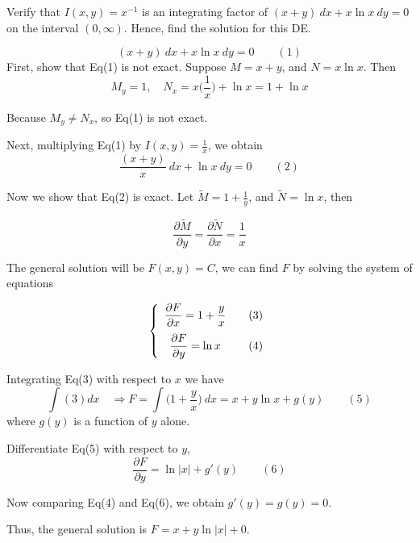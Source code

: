 \begin{example}
    Verify that $I(x,y) = x^{-1}$ is an integrating factor of 
    $(x+y)\> dx + x\ln x \> dy = 0$ on the interval $(0, \infty)$. Hence, find the 
    solution for this DE.
\end{example}
\begin{solution}
    \[
        (x+y)\> dx + x\ln x \> dy = 0 \quad \quad (1)
    \]
    First, show that Eq(1) is not exact. Suppose $M = x+y$, and $N = x\ln x$.
    Then 
    \[
        M_y = 1, \quad N_x = x\biggl(\frac{1}{x}\biggr) + \ln x = 1 + \ln x
    \]

    Because $M_y \neq N_x$, so Eq(1) is not exact.

    Next, multiplying Eq(1) by $\displaystyle I(x,y) = \frac{1}{x}$, we obtain 
    \[
        \frac{(x+y)}{x}\>dx + \ln x \> dy = 0 \quad \quad (2)
    \]

    Now we show that Eq(2) is exact. Let $\displaystyle \tilde{M} = 1 + \frac{1}{y}$, 
    and $\tilde{N} = \ln x$, then 

    \[
        \frac{\partial \tilde{M}}{\partial y} = \frac{\partial \tilde{N}}{\partial x} = \frac{1}{x}
    \]

    The general solution will be $F(x,y) = C$, we can find $F$ by solving 
    the system of equations 

    \[
        \left\{
        \begin{array}{cc}
         \displaystyle \frac{\partial F}{\partial x} = 1+\frac{y}{x} & \quad \refstepcounter{equation}(3)\\[1em]
         \displaystyle \frac{\partial F}{\partial y} = \ln x & \quad \refstepcounter{equation}(4)
        \end{array}
        \right.
    \]

    Integrating Eq(3) with respect to $x$ we have 
    \[
        \int (3) dx \quad \Rightarrow F = \int \biggl(1 + \frac{y}{x}\biggr)\> dx 
        = x + y\ln x + g(y) \quad \quad (5)
    \]
    where $g(y)$ is a function of $y$ alone.

    Differentiate Eq(5) with respect to $y$, 
    \[
        \frac{\partial F}{\partial y} = \ln |x| + g'(y) \quad \quad (6)
    \]

    Now comparing Eq(4) and Eq(6), we obtain $g'(y) = g(y) = 0$.
    
    Thus, the general solution is $F = x + y\ln |x| + 0$.

\end{solution}

